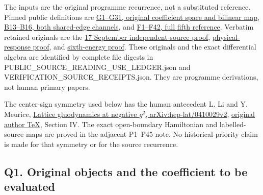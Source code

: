 \documentclass[11pt]{article}
\begin{document}
The inputs are the original programme recurrence, not a substituted reference. Pinned public definitions are \href{https://github.com/KokunoYumeto/yang-mills-interacting-workbench/blob/fa79faff2cd697e16cfa3a7953f36810c22c8922/yang-mills/continuations/20260915-gauge-native-band/RESEARCH_NOTE.md}{G1–G31, original coefficient space and bilinear map}, \href{https://github.com/KokunoYumeto/yang-mills-interacting-workbench/blob/fa79faff2cd697e16cfa3a7953f36810c22c8922/yang-mills/continuations/20260915-gauge-native-band/BAND_AND_CERTIFICATE.md#L125}{B13–B16, both shared-edge channels}, and \href{https://github.com/KokunoYumeto/yang-mills-interacting-workbench/blob/33a4c39de32c2c7fdf6f8ce796e40389f766669f/yang-mills/consolidation/20260921-fifth-reference/package/workbench/yang-mills/continuations/20260921-fifth-reference-return/FIFTH_REFERENCE.md}{F1–F42, full fifth reference}. Verbatim retained originals are the \href{https://github.com/KokunoYumeto/yang-mills-interacting-workbench/blob/main/yang-mills/continuations/20261011-central-signs-shrinking-window/fourth_return/verification_sources/FIFTH_SOURCE.md}{17 September independent-source proof}, \href{https://github.com/KokunoYumeto/yang-mills-interacting-workbench/blob/main/yang-mills/continuations/20261011-central-signs-shrinking-window/fourth_return/verification_sources/PLAQUETTE_RESPONSE.md}{physical-response proof}, and \href{https://github.com/KokunoYumeto/yang-mills-interacting-workbench/blob/main/yang-mills/continuations/20261011-central-signs-shrinking-window/fourth_return/verification_sources/SIXTH_ENERGY.md}{sixth-energy proof}. These originals and the exact differential algebra are identified by complete file digests in PUBLIC\_SOURCE\_READING\_USE\_LEDGER.json and VERIFICATION\_SOURCE\_RECEIPTS.json. They are programme derivations, not human primary papers.

The center-sign symmetry used below has the human antecedent L. Li and Y. Meurice, \href{https://arxiv.org/abs/hep-lat/0410029v2}{Lattice gluodynamics at negative \(g^2\), arXiv:hep-lat/0410029v2}, \href{https://arxiv.org/src/hep-lat/0410029v2}{original author TeX}, Section IV. The exact open-boundary Hamiltonian and labelled-source maps are proved in the adjacent P1–P45 note. No historical-priority claim is made for that symmetry or for the source recurrence.

\subsection*{Q1. Original objects and the coefficient to be evaluated}
\end{document}
